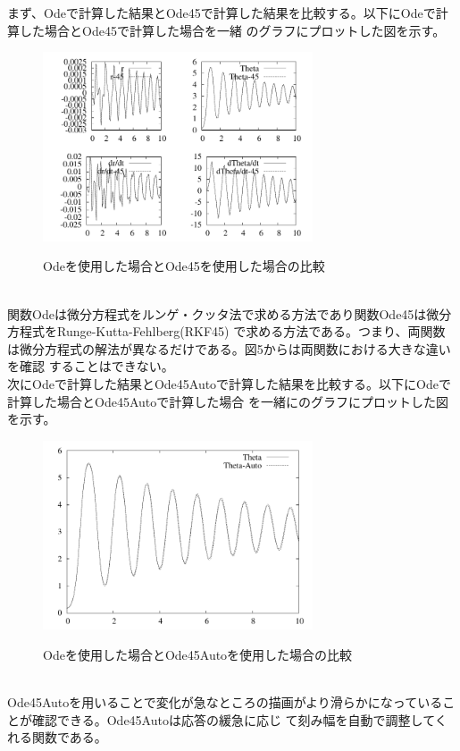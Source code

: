 \documentclass{jarticle}
\begin{document}
\begin{enumerate}
\begin{enumerate}
\begin{enumerate}
				まず、Odeで計算した結果とOde45で計算した結果を比較する。以下にOdeで計算した場合とOde45で計算した場合を一緒
				のグラフにプロットした図を示す。\\
				\begin{figure}[htbp]
					\begin{center}
						\includegraphics[width=8cm]{gazo/OdeOde45Comp.pdf}\\
					\end{center}
					\caption{Odeを使用した場合とOde45を使用した場合の比較}
				\end{figure}
				\\
				関数Odeは微分方程式をルンゲ・クッタ法で求める方法であり関数Ode45は微分方程式をRunge-Kutta-Fehlberg(RKF45)
				で求める方法である。つまり、両関数は微分方程式の解法が異なるだけである。図5からは両関数における大きな違いを確認
				することはできない。\\
				次にOdeで計算した結果とOde45Autoで計算した結果を比較する。以下にOdeで計算した場合とOde45Autoで計算した場合
				を一緒にのグラフにプロットした図を示す。
				\begin{figure}[htbp]
					\begin{center}
						\includegraphics[width=8cm]{gazo/OdeOde45AutoComp.pdf}\\
					\end{center}
					\caption{Odeを使用した場合とOde45Autoを使用した場合の比較}
				\end{figure}
				\\
				Ode45Autoを用いることで変化が急なところの描画がより滑らかになっていることが確認できる。Ode45Autoは応答の緩急に応じ
				て刻み幅を自動で調整してくれる関数である。\\
				

\end{enumerate}
\end{enumerate}
\end{enumerate}
\end{document}
